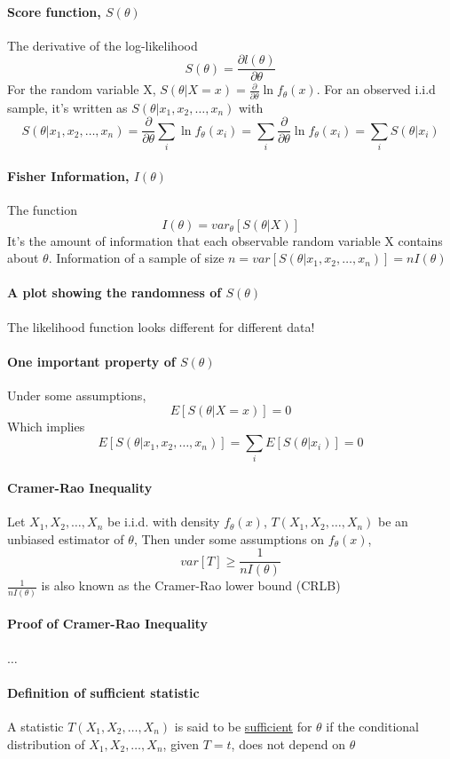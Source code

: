 \documentclass[11pt]{article}
\newcommand{\under}[1]{\underline{#1}}
\begin{document}
 \paragraph{Score function, $S(\theta)$}
 The derivative of the log-likelihood $$S(\theta) = \frac{\partial l(\theta)}{\partial \theta}$$
 For the random variable X, $S(\theta| X = x) = \frac{\partial}{\partial \theta} \ln f_\theta(x)$. For an observed i.i.d sample, it's written as $S(\theta|x_1,x_2,\hdots,x_n)$ with $$S(\theta|x_1,x_2,\hdots,x_n) = \frac{\partial}{\partial \theta} \sum_i \ln f_\theta(x_i) = \sum_i \frac{\partial}{\partial \theta} \ln f_\theta(x_i) = \sum_i S(\theta|x_i)$$
 \paragraph{Fisher Information, $I(\theta)$}
 The function $$I(\theta) = var_\theta[S(\theta|X)]$$ It's the amount of information that each observable random variable X contains about $\theta$. \newline
 Information of a sample of size $n = var[S(\theta|x_1,x_2,\hdots,x_n)] = nI(\theta)$
 \paragraph{A plot showing the randomness of $S(\theta)$}
 The likelihood function looks different for different data!
 \paragraph{One important property of $S(\theta)$}
 Under some assumptions, $$E[S(\theta|X = x)] = 0$$
 Which implies $$E[S(\theta|x_1,x_2,\hdots,x_n)] = \sum_i E[S(\theta|x_i)] = 0$$
 \paragraph{Cramer-Rao Inequality}
 Let $X_1, X_2, \hdots, X_n$ be i.i.d. with density $f_\theta(x)$,
 $T(X_1, X_2, \hdots, X_n)$ be an unbiased estimator of $\theta$,
 Then under some assumptions on $f_\theta(x)$, $$var[T] \geq \frac{1}{nI(\theta)}$$
 $\frac{1}{nI(\theta)}$ is also known as the Cramer-Rao lower bound (CRLB)
 \paragraph{Proof of Cramer-Rao Inequality}
 	$\hdots$
 \paragraph{Definition of sufficient statistic}
 A statistic $T(X_1, X_2, \hdots, X_n)$ is said to be \under{sufficient} for $\theta$ if the conditional distribution of $X_1, X_2, \hdots, X_n$, given $T = t$, does not depend on $\theta$\\
 
\end{document}
